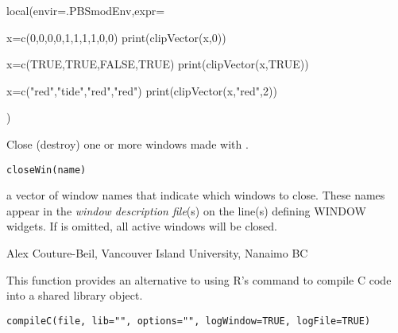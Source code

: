 \documentclass[letterpaper]{book}
\begin{document}
%
\begin{SeeAlso}\relax
 
\end{SeeAlso}
%
\begin{Examples}
\begin{ExampleCode}
local(envir=.PBSmodEnv,expr={
  x=c(0,0,0,0,1,1,1,1,0,0)
  print(clipVector(x,0))

  x=c(TRUE,TRUE,FALSE,TRUE)
  print(clipVector(x,TRUE))

  x=c("red","tide","red","red")
  print(clipVector(x,"red",2))
})
\end{ExampleCode}
\end{Examples}
%
\begin{Description}\relax
Close (destroy) one or more windows made with .
\end{Description}
%
\begin{Usage}
\begin{verbatim}
closeWin(name)
\end{verbatim}
\end{Usage}
%
\begin{Arguments}
\begin{ldescription}
\item[\code{name}] a vector of window names that indicate which windows to close. These 
names appear in the \emph{window description file}(s) on the line(s) defining WINDOW widgets.
If  is omitted, all active windows will be closed.
\end{ldescription}
\end{Arguments}
%
\begin{Author}\relax
Alex Couture-Beil, Vancouver Island University, Nanaimo BC
\end{Author}
%
\begin{SeeAlso}\relax
{}
\end{SeeAlso}
%
\begin{Description}\relax
This function provides an alternative to using R's  
command to compile C code into a shared library object.
\end{Description}
%
\begin{Usage}
\begin{verbatim}
compileC(file, lib="", options="", logWindow=TRUE, logFile=TRUE)
\end{verbatim}
\end{Usage}
\end{document}

